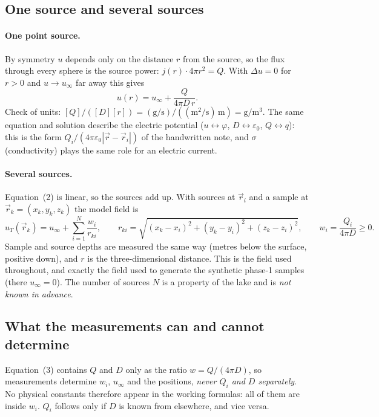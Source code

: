 \documentclass{article}
\begin{document}
\subsection{One source and several sources}

\paragraph{One point source.}
By symmetry $u$ depends only on the distance $r$ from the source, so the flux
through every sphere is the source power: $j(r)\cdot4\pi r^2=Q$. With
$\Delta u=0$ for $r>0$ and $u\to u_\infty$ far away this gives
\[
u(r)=u_\infty+\frac{Q}{4\pi D\,r}.
\tag{3}
\]
Check of units: $[Q]/([D][r])=(\mathrm{g/s})/((\mathrm{m^2/s})\,\mathrm m)=\mathrm{g/m^3}$.
The same equation and solution describe the electric potential
($u\leftrightarrow\varphi$, $D\leftrightarrow\varepsilon_0$, $Q\leftrightarrow q$):
this is the form $Q_i/(4\pi\varepsilon_0|\vec r-\vec r_i|)$ of the handwritten
note, and $\sigma$ (conductivity) plays the same role for an electric current.

\paragraph{Several sources.} Equation~(2) is linear, so the sources add up. With
sources at $\vec r_i$ and a sample at $\vec r_k=(x_k,y_k,z_k)$ the model field is
\begin{equation}
u_T(\vec r_k)=u_\infty+\sum_{i=1}^{N}\frac{w_i}{r_{ki}},\qquad
r_{ki}=\sqrt{(x_k-x_i)^2+(y_k-y_i)^2+(z_k-z_i)^2},\qquad w_i=\frac{Q_i}{4\pi D}\ge0 .
\tag{4}
\end{equation}
Sample and source depths are measured the same way (metres below the surface,
positive down), and $r$ is the three-dimensional distance. This is the field used
throughout, and exactly the field used to generate the synthetic phase-1 samples
(there $u_\infty=0$). The number of sources $N$ is a property of the lake and is
\emph{not known in advance}.

\subsection{What the measurements can and cannot determine}

Equation~(3) contains $Q$ and $D$ only as the ratio $w=Q/(4\pi D)$, so measurements
determine $w_i$, $u_\infty$ and the positions, \emph{never $Q_i$ and $D$ separately}.
No physical constants therefore appear in the working formulas: all of them are
inside $w_i$. $Q_i$ follows only if $D$ is known from elsewhere, and vice versa.
\end{document}
